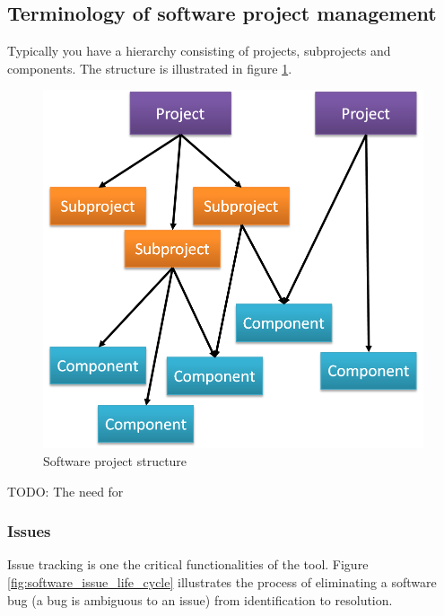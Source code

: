 \documentclass[10pt,a4paper]{article}
\begin{document}
\subsection{Terminology of software project management}
Typically you have a hierarchy consisting of projects, subprojects and components. The structure is illustrated in figure \ref{fig:project_structure}.

\begin{figure}[h]
\centering
\includegraphics[scale=0.6]{fig/project_structure.png} 
\caption{Software project structure}
\label{fig:project_structure}
\end{figure}

TODO: The need for 


\subsubsection{Issues}
Issue tracking is one the critical functionalities of the tool. Figure \ref{fig:software_issue_life_cycle} illustrates the process of eliminating a software bug (a bug is ambiguous to an issue) from identification to resolution.
\end{document}
